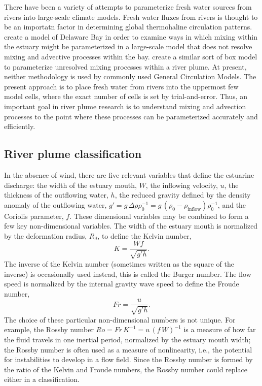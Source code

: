 \documentclass[11pt]{report}
\numberwithin{equation}{section}
\begin{document}
There have been a variety of attempts to parameterize fresh water sources from rivers into large-scale climate models.  Fresh water fluxes from rivers is thought to be an importatn factor in determining global thermohaline circulation patterns.  \citet{garvine.whitney:06} create a model of Delaware Bay in order to examine ways in which mixing within the estuary might be parameterized in a large-scale model that does not resolve mixing and advective processes within the bay.   \citet{hordoir.ea:08} create a similar sort of box model to parameterize unresolved mixing processes within a river plume.  At present, neither methodology is used by commonly used General Circulation Models.  The present approach is to place fresh water from rivers into the uppermost few model cells, where the exact number of cells is set by trial-and-error.  Thus, an important goal in river plume research is to understand mixing and advection processes to the point where these processes can be parameterized accurately and efficiently.

\subsection{River plume classification}

In the absence of wind, there are five relevant variables that define the estuarine discharge:  the width of the estuary mouth, $W$, the inflowing velocity, $u$, the thickness of the outflowing water, $h$, the reduced gravity defined by the density anomaly of the outflowing water, $g' = g\,\Delta\rho \rho_0^{-1} = g\,(\rho_0-\rho_{\mathrm{inflow}}) \rho_0^{-1}$, and the Coriolis parameter, $f$.  These dimensional variables may be combined to form a few key non-dimensional variables.  The width of the estuary mouth is normalized by the deformation radius, $R_d$, to define the Kelvin number,
\begin{equation}
    K = \frac{W f}{\sqrt{g' h}}.
\end{equation}
The inverse of the Kelvin number (sometimes written as the square of the inverse) is occasionally used instead, this is called the Burger number.  The flow speed is normalized by the internal gravity wave speed to define the Froude number,
\begin{equation}
    Fr = \frac{u}{\sqrt{g' h}}.
\end{equation}
The choice of these particular non-dimensional numbers is not unique.  For example, the Rossby number $Ro=Fr\,K^{-1}=u\,(f\,W)^{-1}$ is a measure of how far the fluid travels in one inertial period, normalized by the estuary mouth width; the Rossby number is often used as a measure of nonlinearity, i.e., the potential for instabilities to develop in a flow field.  Since the Rossby number is formed by the ratio of the Kelvin and Froude numbers, the Rossby number could replace either in a classification.
\end{document}
